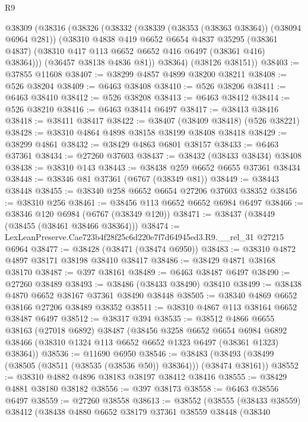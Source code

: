 \begin{lexlean}{R9}
\begin{coremodule}
    @38309
      (@38316
        (@38326
          (@38332
            (@38339 (@38353 (@38363 @38364)) (@38094 @6964 @281))
            (@38310
              @4838
              @419
              @6652
              @6654
              @4837
              @35295
              (@38361 @4837)
              (@38310 @417 @113 @6652 @6652 @416 @6497 (@38361 @416) @38364)))
          (@36457 @38138 @4836 @81))
        @38364)
      (@38126 @38151))
@38403 := @37855 @11608
@38407 := @38299 @4857 @4899 @38200 @38211
@38408 := @526 @38204
@38409 := @6463 @38408
@38410 := @526 @38206
@38411 := @6463 @38410
@38412 := @526 @38208
@38413 := @6463 @38412
@38414 := @526 @38210
@38416 := @6463 @38414 @6497
@38417 := @38413 @38416
@38418 := @38411 @38417
@38422 := @38407 (@38409 @38418) (@526 @38221)
@38428 := @38310 @4864 @4898 @38158 @38199 @38408 @38418
@38429 := @38299 @4861
@38432 := @38429 @4863 @6801 @38157
@38433 := @6463 @37361
@38434 := @27260 @37603
@38437 := @38432 (@38433 @38434) @38408
@38438 := @38310 @143
@38443 := @38438 @259 @6652 @6655 @37361 @38434
@38448 := @38346 @81 @37361 (@6767 (@38349 @81))
@38449 := @38443 @38448
@38455 := @38340 @258 @6652 @6654 @27206 @37603 @38352
@38456 := @38310 @256
@38461 := @38456 @113 @6652 @6652 @6984 @6497
@38466 := @38346 @120 @6984 (@6767 (@38349 @120))
@38471 := @38437 (@38449 (@38455 (@38461 @38466 @38364)))
@38474 := LexLeanPreserve.Cae723b4f28f25c6d220e7f7d64945ed3.R9.__rel_31 @27215 @6964
@38477 := @38428 (@38471 (@38474 @6950))
@38483 := @38310 @4872 @4897 @38171 @38198 @38410 @38417
@38486 := @38429 @4871 @38168 @38170
@38487 := @397 @38161
@38489 := @6463 @38487 @6497
@38490 := @27260 @38489
@38493 := @38486 (@38433 @38490) @38410
@38499 := @38438 @4870 @6652 @38167 @37361 @38490 @38448
@38505 := @38340 @4869 @6652 @38166 @27206 @38489 @38352
@38511 := @38310 @4867 @113 @38164 @6652 @38487 @6497
@38512 := @38317 @394
@38535 := @38512
    @4866
    @6655
    @38163
    (@27018 @6892)
    @38487
    (@38456
      @3258
      @6652
      @6654
      @6984
      @6892
      @38466
      (@38310 @1324 @113 @6652 @6652 @1323 @6497 (@38361 @1323) @38364))
@38536 := @11690 @6950
@38546 := @38483 (@38493 (@38499 (@38505 (@38511 (@38535 (@38536 @50)) @38364))) (@38474 @38161))
@38552 := @38310 @4882 @4896 @38183 @38197 @38412 @38416
@38555 := @38429 @4881 @38180 @38182
@38556 := @397 @38173
@38558 := @6463 @38556 @6497
@38559 := @27260 @38558
@38613 := @38552
    (@38555
      (@38433 @38559)
      @38412
      (@38438
        @4880
        @6652
        @38179
        @37361
        @38559
        @38448
        (@38340

\end{coremodule}
\end{lexlean}
